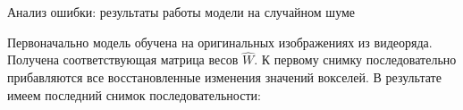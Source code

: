 \documentclass[9pt,pdf]{beamer} %
\begin{document}
\begin{frame}{Анализ ошибки: результаты работы модели на случайном шуме}

Первоначально модель обучена на оригинальных изображениях из видеоряда.
Получена соответствующая матрица весов $\hat{W}$. 
К первому снимку последовательно прибавляются все восстановленные изменения значений вокселей. 
В результате имеем последний снимок последовательности:
\begin{figure}[h!]
    \centering
    \hfill
    \hfill
    \label{fig:7}
\end{figure}
\end{frame}
\end{document}

